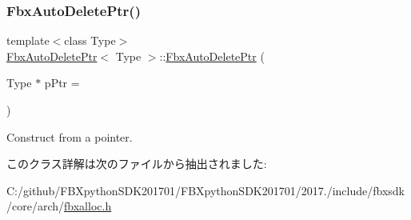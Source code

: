 \subsubsection{\texorpdfstring{Fbx\+Auto\+Delete\+Ptr()}{FbxAutoDeletePtr()}}
{\footnotesize\ttfamily template$<$class Type$>$ \\
\hyperlink{class_fbx_auto_delete_ptr}{Fbx\+Auto\+Delete\+Ptr}$<$ Type $>$\+::\hyperlink{class_fbx_auto_delete_ptr}{Fbx\+Auto\+Delete\+Ptr} (\begin{DoxyParamCaption}\item[{Type $\ast$}]{p\+Ptr = {} }\end{DoxyParamCaption})\hspace{0.3cm}{\ttfamily [explicit]}}



Construct from a pointer. 



このクラス詳解は次のファイルから抽出されました\+:\begin{DoxyCompactItemize}
\item 
C\+:/github/\+F\+B\+Xpython\+S\+D\+K201701/\+F\+B\+Xpython\+S\+D\+K201701/2017./include/fbxsdk/core/arch/\hyperlink{fbxalloc_8h}{fbxalloc.\+h}\end{DoxyCompactItemize}
